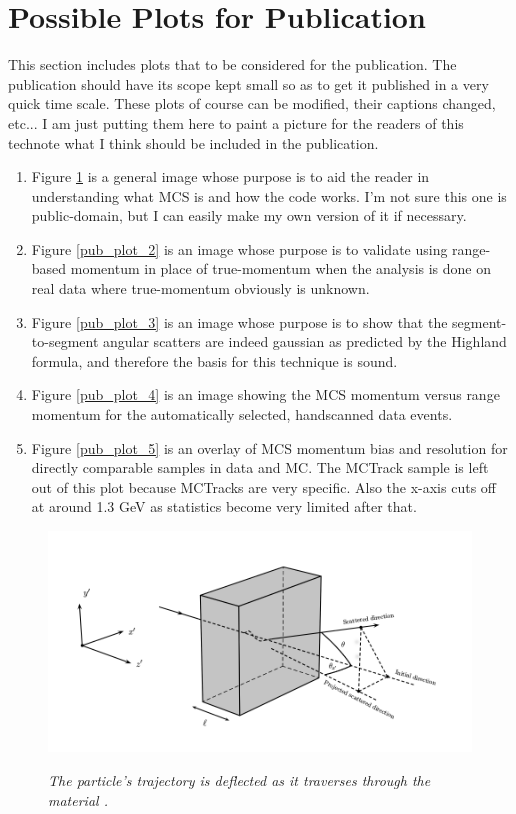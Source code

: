 \section{Possible Plots for Publication}\label{publicplots_section}
This section includes plots that to be considered for the publication. The publication should have its scope kept small so as to get it published in a very quick time scale. These plots of course can be modified, their captions changed, etc... I am just putting them here to paint a picture for the readers of this technote what I think should be included in the publication.
\begin{enumerate}
	\item Figure \ref{pub_plot_1} is a general image whose purpose is to aid the reader in understanding what MCS is and how the code works. I'm not sure this one is public-domain, but I can easily make my own version of it if necessary.
	\item Figure \ref{pub_plot_2} is an image whose purpose is to validate using range-based momentum in place of true-momentum when the analysis is done on real data where true-momentum obviously is unknown.
	\item Figure \ref{pub_plot_3} is an image whose purpose is to show that the segment-to-segment angular scatters are indeed gaussian as predicted by the Highland formula, and therefore the basis for this technique is sound.
	\item Figure \ref{pub_plot_4} is an image showing the MCS momentum versus range momentum for the automatically selected, handscanned data events.
	\item Figure \ref{pub_plot_5} is an overlay of MCS momentum bias and resolution for directly comparable samples in data and MC. The {\sc MCTrack} sample is left out of this plot because {\sc MCTracks} are very {\ub} specific. Also the x-axis cuts off at around 1.3 GeV as statistics become very limited after that.
\end{enumerate}

\begin{figure}[ht!]
\centering
	\includegraphics[width=0.5\linewidth]{Figures/static_figs/mcs_nocap.png} \\
\caption{\textit{The particle's trajectory is deflected as it traverses through the material \cite{leonidas1}.}}\label{pub_plot_1}
\end{figure}

